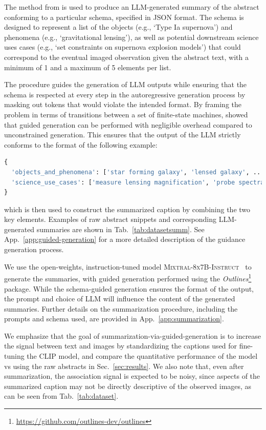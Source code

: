 \documentclass[10pt]{article} %
\newcommand{\package}[1]{\textsl{#1}\xspace}
\begin{document}
The method from \cite{willard2023efficient} is used to produce an LLM-generated summary of the abstract conforming to a particular schema, specified in JSON format.
%
The schema is designed to represent a list of the objects (e.g., `Type Ia supernova') and phenomena (e.g., `gravitational lensing'), as well as potential downstream science uses cases (e.g., `set constraints on supernova explosion models') that could correspond to the eventual imaged observation given the abstract text, with a minimum of 1 and a maximum of 5 elements per list.

The procedure guides the generation of LLM outputs while ensuring that the schema is respected at every step in the autoregressive generation process by masking out tokens that would violate the intended format.
%
By framing the problem in terms of transitions between a set of finite-state machines, \cite{willard2023efficient} showed that guided generation can be performed with negligible overhead compared to unconstrained generation.
%
This ensures that the output of the LLM strictly conforms to the format of the following example:
\begin{lstlisting}[language=Python]
{
  'objects_and_phenomena': ['star forming galaxy', 'lensed galaxy', ...], 
  'science_use_cases': ['measure lensing magnification', 'probe spectral energy distributions', ...]
}
\end{lstlisting}
which is then used to construct the summarized caption by combining the two key elements.
%
Examples of raw abstract snippets and corresponding LLM-generated summaries are shown in Tab.~\ref{tab:datasetsumm}.
%
See App.~\ref{app:guided-generation} for a more detailed description of the guidance generation process.

We use the open-weights, instruction-tuned model \textsc{Mixtral-8x7B-Instruct}~\citep{jiang2024mixtral} to generate the summaries, with guided generation performed using the \package{Outlines}\footnote{\url{https://github.com/outlines-dev/outlines}} package.
%
While the schema-guided generation ensures the format of the output, the prompt and choice of LLM will influence the content of the generated summaries.
%
Further details on the summarization procedure, including the prompts and schema used, are provided in App.~\ref{app:summarization}.

We emphasize that the goal of summarization-via-guided-generation is to increase the signal between text and images by standardizing the captions used for fine-tuning the CLIP model, and compare the quantitative performance of the model vs using the raw abstracts in Sec.~\ref{sec:results}.
%
We also note that, even after summarization, the association signal is expected to be noisy, since aspects of the summarized caption may not be directly descriptive of the observed images, as can be seen from Tab.~\ref{tab:dataset}.
\end{document}
